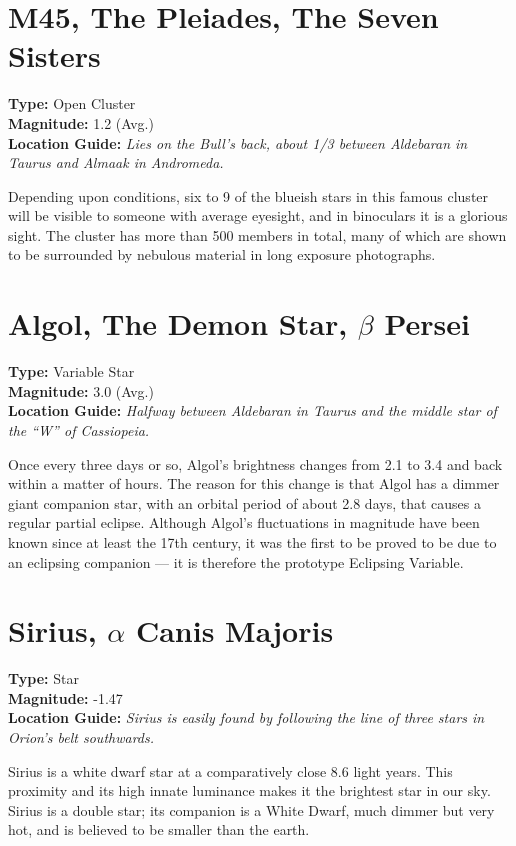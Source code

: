 \section{M45, The Pleiades, The Seven Sisters}
\textbf{Type:} Open Cluster \\
\textbf{Magnitude:} 1.2 (Avg.) \\
\textbf{Location Guide:} \textit{Lies on the Bull's back, about 1/3 between Aldebaran in Taurus and Almaak in Andromeda.} 

Depending upon conditions, six to 9 of the blueish stars in this
famous cluster will be visible to someone with average eyesight, and in
binoculars it is a glorious sight. The cluster has more than 500
members in total, many of which are shown to be surrounded by nebulous
material in long exposure photographs.

\section{Algol, The Demon Star, \texorpdfstring{$\beta$}{beta} Persei}
\textbf{Type:} Variable Star \\
\textbf{Magnitude:} 3.0 (Avg.) \\
\textbf{Location Guide:} \textit{Halfway between Aldebaran in Taurus and the middle star of the ``W'' of Cassiopeia.}

Once every three days or so, Algol's brightness changes from 2.1 to 3.4
and back within a matter of hours. The reason for this change is that
Algol has a dimmer giant companion star, with an orbital period of
about 2.8 days, that causes a regular partial eclipse. Although
Algol's fluctuations in magnitude have been known since at least the
17th century, it was the first to be proved to be due to an eclipsing
companion --- it is therefore the prototype Eclipsing Variable.

\section{Sirius, \texorpdfstring{$\alpha$}{alpha} Canis Majoris}
\textbf{Type:} Star \\
\textbf{Magnitude:} -1.47 \\
\textbf{Location Guide:} \textit{Sirius is easily found by following the line of three stars in Orion's belt southwards.} 

Sirius is a white dwarf star at a comparatively close 8.6 light
years. This proximity and its high innate luminance makes it the
brightest star in our sky. Sirius is a double star; its companion is a White Dwarf, much dimmer but very hot, and is believed to be smaller than the earth.

